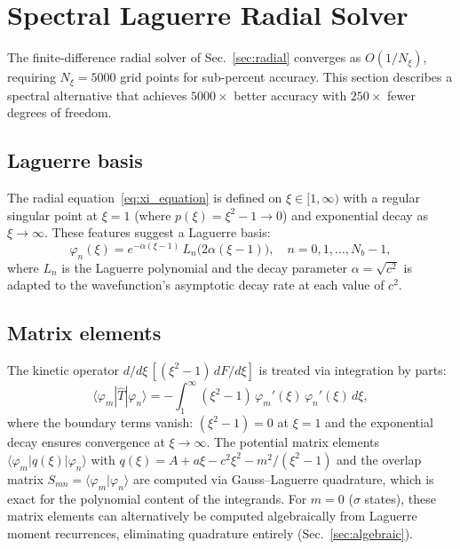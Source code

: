 \documentclass[aps,pra,twocolumn,superscriptaddress,longbibliography]{revtex4-2}
\begin{document}

\section{Spectral Laguerre Radial Solver}
\label{sec:spectral_radial}

The finite-difference radial solver of Sec.~\ref{sec:radial} converges
as $O(1/N_\xi)$, requiring $N_\xi = 5000$ grid points for sub-percent
accuracy.  This section describes a spectral alternative that achieves
$5000\times$ better accuracy with $250\times$ fewer degrees of freedom.

\subsection{Laguerre basis}

The radial equation~\eqref{eq:xi_equation} is defined on
$\xi \in [1, \infty)$ with a regular singular point at $\xi = 1$
(where $p(\xi) = \xi^2 - 1 \to 0$) and exponential decay as
$\xi \to \infty$.  These features suggest a Laguerre basis:
\begin{equation}
  \varphi_n(\xi) = e^{-\alpha(\xi - 1)}\,L_n\bigl(2\alpha(\xi - 1)\bigr),
  \quad n = 0, 1, \ldots, N_b - 1,
  \label{eq:laguerre_basis}
\end{equation}
where $L_n$ is the Laguerre polynomial and the decay parameter
$\alpha = \sqrt{c^2}$ is adapted to the wavefunction's asymptotic
decay rate at each value of $c^2$.

\subsection{Matrix elements}

The kinetic operator $d/d\xi\,[(\xi^2 - 1)\,dF/d\xi]$ is treated
via integration by parts:
\begin{equation}
  \langle \varphi_m | \hat{T} | \varphi_n \rangle
  = -\int_1^\infty (\xi^2 - 1)\,\varphi_m'(\xi)\,\varphi_n'(\xi)\,d\xi,
  \label{eq:ibp}
\end{equation}
where the boundary terms vanish: $(\xi^2 - 1) = 0$ at $\xi = 1$
and the exponential decay ensures convergence at $\xi \to \infty$.
The potential matrix elements
$\langle \varphi_m | q(\xi) | \varphi_n \rangle$ with
$q(\xi) = A + a\xi - c^2\xi^2 - m^2/(\xi^2 - 1)$ and the overlap
matrix $S_{mn} = \langle \varphi_m | \varphi_n \rangle$ are computed
via Gauss--Laguerre quadrature, which is exact for the polynomial
content of the integrands.  For $m = 0$ ($\sigma$ states), these
matrix elements can alternatively be computed algebraically from
Laguerre moment recurrences, eliminating quadrature entirely
(Sec.~\ref{sec:algebraic}).
\end{document}
